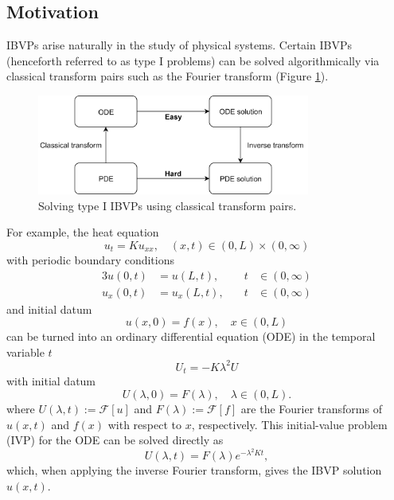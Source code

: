 \documentclass[12pt, oneside, a4paper]{article}
\begin{document}
\subsection{Motivation}\label{sec:motivation}

IBVPs arise naturally in the study of physical systems. Certain IBVPs (henceforth referred to as type I problems) can be solved algorithmically via classical transform pairs such as the Fourier transform (Figure \ref{fig:classical_transform}). 
\begin{figure}[htpb!]
    \centering
    \includegraphics[width=0.8\textwidth]{classical_transform.png}
    \caption{Solving type I IBVPs using classical transform pairs.}
    \label{fig:classical_transform}
\end{figure}

\noindent For example, the heat equation \cite{Pinsky1991}
\[u_t = Ku_{xx},\quad (x,t)\in (0, L)\times (0,\infty)\]
with periodic boundary conditions
\begin{alignat*}{3}
    u(0, t) &= u(L, t),&\quad t&\in (0,\infty)\\
    u_x(0, t) &= u_x(L, t),&\quad t&\in (0,\infty)
\end{alignat*}
and initial datum
\[u(x,0) = f(x), \quad x\in (0, L)\]
can be turned into an ordinary differential equation (ODE) in the temporal variable $t$
\[U_t = -K\lambda^2U\]
with initial datum
\[U(\lambda,0) = F(\lambda),\quad \lambda\in (0,L).\]
where $U(\lambda,t):=\mathcal{F}[u]$ and $F(\lambda):=\mathcal{F}[f]$ are the Fourier transforms of $u(x,t)$ and $f(x)$ with respect to $x$, respectively. This initial-value problem (IVP) for the ODE can be solved directly as 
\[U(\lambda,t) = F(\lambda)e^{-\lambda^2 K t},\]
which, when applying the inverse Fourier transform, gives the IBVP solution $u(x,t)$.

\end{document}
